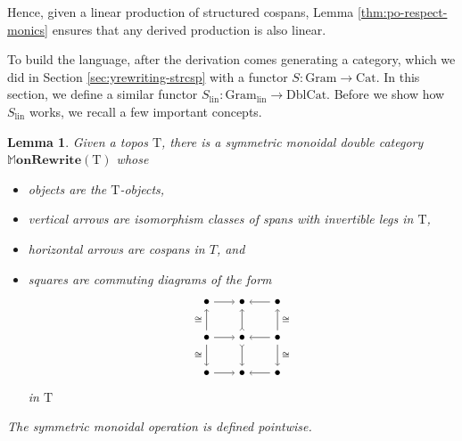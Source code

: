 \documentclass{amsart}
\newcommand{\lin}{_{\t{lin}}}
\newcommand{\iso}{\cong}
\newcommand{\Cat}{\cat{Cat}}
\newcommand{\DblCat}{\cat{DblCat}}
\newcommand{\Gram}{\cat{Gram}}
\newcommand{\MMMonRewrite}{\dblcat{M}\bicat{onRewrite}}
\newcommand{\cat}[1]{\mathrm{#1}}
\newcommand{\bicat}[1]{\mathbf{#1}}
\newcommand{\dblcat}[1]{\mathbb{#1}}
\renewcommand{\t}[1]{\text{#1}}
\newcommand{\from}{\colon}
\newtheorem{lemma}[theorem]{Lemma}
\theoremstyle{remark}
\theoremstyle{definition}
\begin{document}
Hence, given a linear production of structured cospans, Lemma
\ref{thm:po-respect-monics} ensures that any derived production is
also linear.


To build the language, after the derivation comes generating a
category, which we did in Section \ref{sec:yrewriting-strcsp} with a
functor 
%
\(
  S \from \Gram \to \Cat.
\)
% 
In this section, we define a similar functor
%
\(
  S\lin \from \Gram\lin \to \DblCat.
\)
% 
Before we show how $ S\lin $ works, we recall a few important
concepts.

\begin{lemma}

  Given a topos $ \cat{T} $, there is a symmetric monoidal double
  category $ \MMMonRewrite (\cat{T}) $ whose
  \begin{itemize}
  \item objects are the $ \cat{T} $-objects,
  \item vertical arrows are isomorphism classes of spans with
    invertible legs in $ \cat{T} $,
  \item horizontal arrows are cospans in $ T $, and
  \item squares are commuting diagrams of the form
    \[
      \begin{tikzpicture}
        \node (1) at (0,2) {\( \bullet \)};
        \node (2) at (1,2) {\( \bullet \)};
        \node (3) at (2,2) {\( \bullet \)};
        \node (4) at (0,1) {\( \bullet \)};
        \node (5) at (1,1) {\( \bullet \)};
        \node (6) at (2,1) {\( \bullet \)};
        \node (7) at (0,0) {\( \bullet \)};
        \node (8) at (1,0) {\( \bullet \)};
        \node (9) at (2,0) {\( \bullet \)};
        \draw [->] (1) to node [] {\scriptsize{\(  \)}} (2);
        \draw [->] (3) to node [] {\scriptsize{\(  \)}} (2);
        \draw [->] (4) to node [] {\scriptsize{\(  \)}} (5);
        \draw [->] (6) to node [] {\scriptsize{\(  \)}} (5);
        \draw [->] (7) to node [] {\scriptsize{\(  \)}} (8);
        \draw [->] (9) to node [] {\scriptsize{\(  \)}} (8);
        \draw [->] (4) to node [left] {\scriptsize{\( \iso \)}} (1);
        \draw [->] (4) to node [left] {\scriptsize{\( \iso \)}} (7);
        \draw [>->] (5) to node [] {\scriptsize{\(  \)}} (2);
        \draw [>->] (5) to node [] {\scriptsize{\(  \)}} (8);
        \draw [->] (6) to node [right] {\scriptsize{\( \iso \)}} (3);
        \draw [->] (6) to node [right] {\scriptsize{\( \iso \)}} (9);
      \end{tikzpicture}
    \]
  in $ \cat{T} $
  \end{itemize}

  The symmetric monoidal operation is defined pointwise.

\end{lemma}
\end{document}

